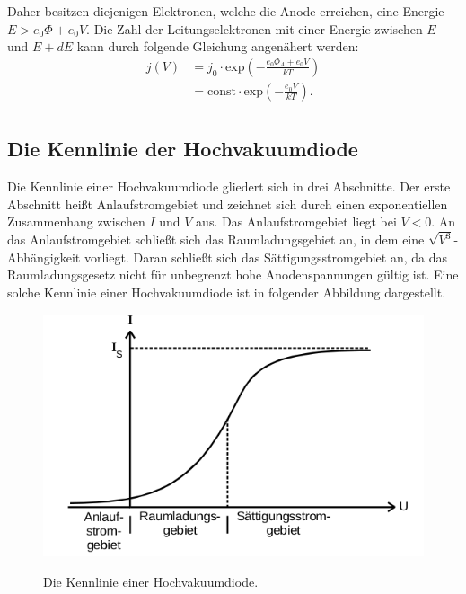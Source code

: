 \noindent
Daher besitzen diejenigen Elektronen, welche die Anode erreichen, eine Energie
$E > e_0 \Phi + e_0 V$. Die Zahl der Leitungselektronen mit einer Energie zwischen
$E$ und $E + dE$ kann durch folgende Gleichung angenähert werden:
\begin{align}
  j(V) & = j_0 \cdot \text{exp}\left(-\frac{e_0 \Phi_A + e_0 V}{kT}\right) \\
       & = \text{const} \cdot  \text{exp}\left(-\frac{e_0 V}{kT}\right).     \\
  \label{eqn:anlaufstrom}
\end{align}

\subsection{Die Kennlinie der Hochvakuumdiode}
Die Kennlinie einer Hochvakuumdiode gliedert sich in drei Abschnitte. Der erste
Abschnitt heißt Anlaufstromgebiet und zeichnet sich durch einen exponentiellen
Zusammenhang zwischen $I$ und $V$ aus. Das Anlaufstromgebiet liegt bei $V < 0$.
An das Anlaufstromgebiet schließt sich das Raumladungsgebiet an, in dem eine
$\sqrt{V^3}$-Abhängigkeit vorliegt. Daran schließt sich das Sättigungsstromgebiet
an, da das Raumladungsgesetz nicht für unbegrenzt hohe Anodenspannungen gültig ist.
Eine solche Kennlinie einer Hochvakuumdiode ist in folgender Abbildung dargestellt.
\begin{figure}[H]
  \centering
  \includegraphics[scale=0.5]{content/kennlinie.png}
  \label{fig:kennlinie}
  \caption{Die Kennlinie einer Hochvakuumdiode.}
\end{figure}
